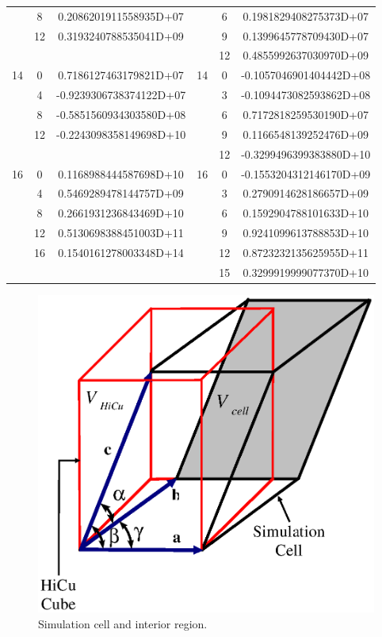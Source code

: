 \commentoutA{\documentclass[prb,aps,twocolumn,showpacs,twocolumngrid,superbib]{revtex4}}
\begin{document}
\begin{table}
{\begin{tabular}{|c|c|c||c|c|c|}
&
8&
0.2086201911558935D+07&
&
6&
0.1981829408275373D+07\\
&
12&
0.3193240788535041D+09&
&
9&
0.1399645778709430D+07\\
&
&
&
&
12&
0.4855992637030970D+09\\
\hline 
14&
0&
0.7186127463179821D+07&
14&
0&
-0.1057046901404442D+08\\
&
4&
-0.9239306738374122D+07&
&
3&
-0.1094473082593862D+08\\
&
8&
-0.5851560934303580D+08 &
&
6&
0.7172818259530190D+07\\
&
12&
-0.2243098358149698D+10&
&
9&
0.1166548139252476D+09\\
&
&
&
&
12&
-0.3299496399383880D+10\\
\hline 
16&
0&
0.1168988444587698D+10&
16&
0&
-0.1553204312146170D+09\\
&
4&
0.5469289478144757D+09&
&
3&
0.2790914628186657D+09\\
&
8&
0.2661931236843469D+10&
&
6&
0.1592904788101633D+10\\
&
12&
0.5130698388451003D+11&
&
9&
0.9241099613788853D+10\\
&
16&
0.1540161278003348D+14 &
&
12&
0.8723232135625955D+11 \\
&
&
&
&
15&
0.3299919999077370D+10\\
\hline
\end{tabular}\par}
\vspace{0.3cm}
\end{table}


\eject


\begin{figure}

\caption{\label{figure: SimCell} Simulation cell and interior region.}

{\centering \includegraphics{UnitCell.eps} \par}
\end{figure}
\end{document}
